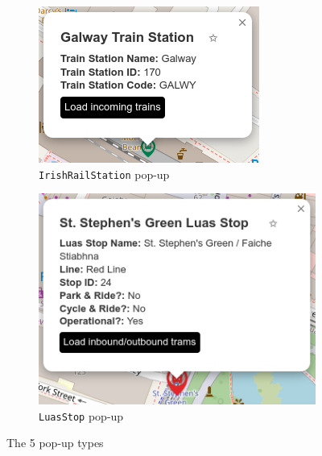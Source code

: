 \documentclass[a4paper,11pt]{report}
\begin{document}
\begin{figure}[H]
    \begin{subfigure}[c]{0.3\textwidth}
        \centering
        \includegraphics[width=\textwidth]{./images/irishrailstationpopup.png}
        \caption{\texttt{IrishRailStation} pop-up}
    \end{subfigure}
    \hfill
    \begin{subfigure}[c]{0.3\textwidth}
        \centering
        \includegraphics[width=\textwidth]{./images/luasstoppopup.png}
        \caption{\texttt{LuasStop} pop-up}
    \end{subfigure}
    \hfill

    \caption{The 5 pop-up types}
\end{figure}
\end{document}
